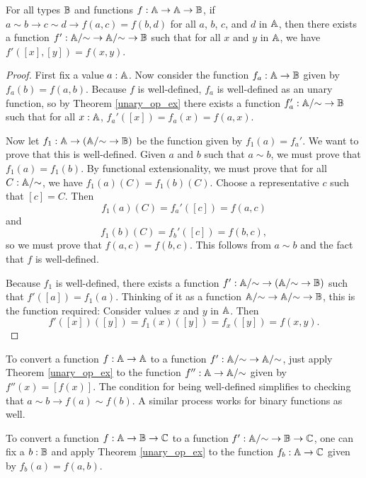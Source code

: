 \documentclass[../math.tex]{subfiles}
\begin{document}
\begin{theorem} \label{binary_op_ex}
    For all types $\mathbb{B}$ and functions $f : \mathbb{A} \to \mathbb{A} \to \mathbb{B}$, if $a \sim b \to c
    \sim d \to f(a, c) = f(b, d)$ for all $a$, $b$, $c$, and $d$ in $\mathbb{A}$, then
    there exists a function $f' : \mathbb{A}/{\sim} \to \mathbb{A}/{\sim} \to \mathbb{B}$ such that for
    all $x$ and $y$ in $\mathbb{A}$, we have $f'([x], [y]) = f(x, y)$.
\end{theorem}
\begin{proof}
    First fix a value $a : \mathbb{A}$.  Now consider the function $f_a : \mathbb{A} \to \mathbb{B}$
    given by $f_a(b) = f(a, b)$.  Because $f$ is well-defined, $f_a$ is
    well-defined as an unary function, so by Theorem \ref{unary_op_ex} there
    exists a function $f_a' : \mathbb{A}/{\sim} \to \mathbb{B}$ such that for all $x : \mathbb{A}$,
    $f_a'([x]) = f_a(x) = f(a, x)$.

    Now let $f_1 : \mathbb{A} \to (\mathbb{A}/{\sim} \to \mathbb{B})$ be the function given by $f_1(a) =
    f_a'$.  We want to prove that this is well-defined.  Given $a$ and $b$ such
    that $a \sim b$, we must prove that $f_1(a) = f_1(b)$.  By functional
    extensionality, we must prove that for all $C : \mathbb{A}/{\sim}$, we have
    $f_1(a)(C) = f_1(b)(C)$.  Choose a representative $c$ such that $[c] = C$.
    Then
    \[
        f_1(a)(C) = f_a'([c]) = f(a, c)
    \]
    and
    \[
        f_1(b)(C) = f_b'([c]) = f(b, c),
    \]
    so we must prove that $f(a, c) = f(b, c)$.  This follows from $a \sim b$ and
    the fact that $f$ is well-defined.

    Because $f_1$ is well-defined, there exists a function $f' : \mathbb{A}/{\sim} \to
    (\mathbb{A}/{\sim} \to \mathbb{B})$ such that $f'([a]) = f_1(a)$.  Thinking of it as a
    function $\mathbb{A}/{\sim} \to \mathbb{A}/{\sim} \to \mathbb{B}$, this is the function required:
    Consider values $x$ and $y$ in $\mathbb{A}$.  Then
    \[
        f'([x])([y]) = f_1(x)([y]) = f_x([y]) = f(x, y).
    \]
\end{proof}

To convert a function $f : \mathbb{A} \to \mathbb{A}$ to a function $f' : \mathbb{A}/{\sim} \to
\mathbb{A}/{\sim}$, just apply Theorem \ref{unary_op_ex} to the function $f'' : \mathbb{A} \to
\mathbb{A}/{\sim}$ given by $f''(x) = [f(x)]$.  The condition for being well-defined
simplifies to checking that $a \sim b \to f(a) \sim f(b)$.  A similar process
works for binary functions as well.

To convert a function $f : \mathbb{A} \to \mathbb{B} \to \mathbb{C}$ to a function $f' : \mathbb{A}/{\sim} \to \mathbb{B}
\to \mathbb{C}$, one can fix a $b : \mathbb{B}$ and apply Theorem \ref{unary_op_ex} to the
function $f_b : \mathbb{A} \to \mathbb{C}$ given by $f_b(a) = f(a, b)$.
\end{document}
